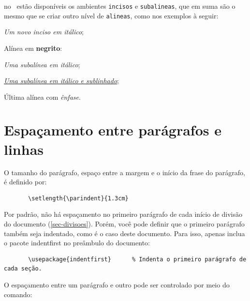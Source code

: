 \begin{alineas}
      \item no \abnTeX\ estão disponíveis os ambientes \texttt{incisos} e
      \texttt{subalineas}, que em suma são o mesmo que se criar outro nível de
      \texttt{alineas}, como nos exemplos à seguir:

      \begin{incisos}
        \item \textit{Um novo inciso em itálico};
      \end{incisos}

      \item Alínea em \textbf{negrito}:

      \begin{subalineas}
        \item \textit{Uma subalínea em itálico};
        \item \underline{\textit{Uma subalínea em itálico e sublinhado}};
      \end{subalineas}

      \item Última alínea com \emph{ênfase}.

    \end{alineas}

    \section{Espaçamento entre parágrafos e linhas}

    O tamanho do parágrafo, espaço entre a margem
    e o início da frase do parágrafo, é definido por:

    \begin{verbatim}
       \setlength{\parindent}{1.3cm}
    \end{verbatim}

    Por padrão, não há espaçamento no
    primeiro parágrafo de cada início de divisão do documento
    (\autoref{sec-divisoes}). Porém, você pode definir que o primeiro parágrafo
    também seja indentado, como é o caso deste documento. Para isso, apenas inclua o
    pacote \textsf{indentfirst} no preâmbulo do documento:

    \begin{verbatim}
       \usepackage{indentfirst}      % Indenta o primeiro parágrafo de cada seção.
    \end{verbatim}

    O espaçamento entre um parágrafo e outro
    pode ser controlado por meio do comando:

